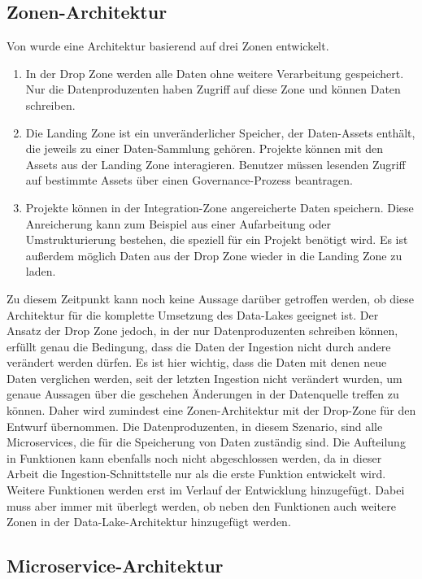 \subsection{Zonen-Architektur}
Von \textcite{ingestion_02} wurde eine Architektur basierend auf drei Zonen entwickelt.
\begin{enumerate}
    \item In der Drop Zone werden alle Daten ohne weitere Verarbeitung gespeichert.
    Nur die Datenproduzenten haben Zugriff auf diese Zone und können Daten schreiben.
    \item Die Landing Zone ist ein unveränderlicher Speicher, der Daten-Assets enthält, die jeweils zu einer Daten-Sammlung gehören. Projekte können mit den Assets aus der Landing Zone interagieren.
    Benutzer müssen lesenden Zugriff auf bestimmte Assets über einen Governance-Prozess beantragen.
    \item Projekte können in der Integration-Zone angereicherte Daten speichern.
    Diese Anreicherung kann zum Beispiel aus einer Aufarbeitung oder Umstrukturierung bestehen, die speziell für ein Projekt benötigt wird.
    Es ist außerdem möglich Daten aus der Drop Zone wieder in die Landing Zone zu laden.
\end{enumerate}
Zu diesem Zeitpunkt kann noch keine Aussage darüber getroffen werden, ob diese Architektur für die komplette Umsetzung des Data-Lakes geeignet ist.
Der Ansatz der Drop Zone jedoch, in der nur Datenproduzenten schreiben können, erfüllt genau die Bedingung, dass die Daten der Ingestion nicht durch andere verändert werden dürfen.
Es ist hier wichtig, dass die Daten mit denen neue Daten verglichen werden, seit der letzten Ingestion nicht verändert wurden, um genaue Aussagen über die geschehen Änderungen in der Datenquelle treffen zu können.
Daher wird zumindest eine Zonen-Architektur mit der Drop-Zone für den Entwurf übernommen.
Die Datenproduzenten, in diesem Szenario, sind alle Microservices, die für die Speicherung von Daten zuständig sind.
Die Aufteilung in Funktionen kann ebenfalls noch nicht abgeschlossen werden, da in dieser Arbeit die Ingestion-Schnittstelle nur als die erste Funktion entwickelt wird.
Weitere Funktionen werden erst im Verlauf der Entwicklung hinzugefügt.
Dabei muss aber immer mit überlegt werden, ob neben den Funktionen auch weitere Zonen in der Data-Lake-Architektur hinzugefügt werden.

\subsection{Microservice-Architektur}
\label{sec:arch}


